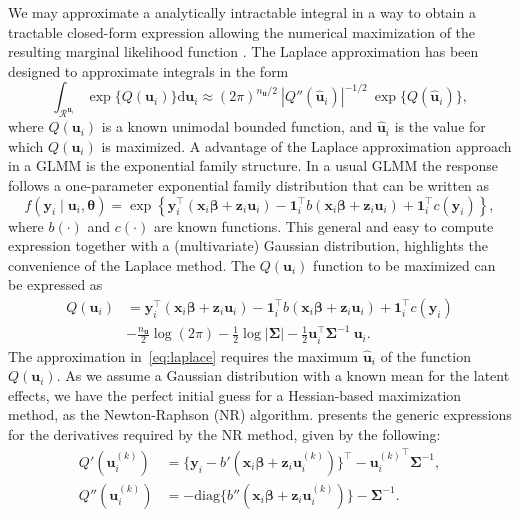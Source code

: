\documentclass[a4paper,12pt]{article}
\begin{document}
We may approximate a analytically intractable integral in a way to
obtain a tractable closed-form expression allowing the numerical
maximization of the resulting marginal likelihood function
\citep{patrao}. The Laplace approximation has been designed to
approximate integrals in the form
\begin{equation}
 \int_{\mathcal{R}^{\bm{u}_{i}}}
 \exp\{Q(\bm{u}_{i})\} \text{d} \bm{u}_{i}\approx
 (2\pi)^{n_{\bm{u}}/2}~
 |{Q}''(\bm{\hat{u}}_{i})|^{-1/2}~\exp\{Q(\bm{\hat{u}}_{i})\},
 \label{eq:laplace}
\end{equation}
where \(Q(\bm{u}_{i})\) is a known unimodal bounded function, and
\(\bm{\hat{u}}_{i}\) is the value for which \(Q(\bm{u}_{i})\) is
maximized. A advantage of the Laplace approximation approach in a GLMM
is the exponential family structure. In a usual GLMM the response
follows a one-parameter exponential family distribution that can be
written as
\[
 f(\bm{y}_{i} \mid \bm{u}_{i}, \bm{\theta}) =
 \exp \left\{
  \bm{y}_{i}^{\top} (\bm{x}_{i}\bm{\beta} + \bm{z}_{i}\bm{u}_{i}) -
  \bm{1}_{i}^{\top}b(\bm{x}_{i}\bm{\beta} + \bm{z}_{i}\bm{u}_{i}) +
  \bm{1}_{i}^{\top} c(\bm{y}_{i})
      \right\},
\]
where \(b(\cdot)\) and \(c(\cdot)\) are known functions. This general
and easy to compute expression together with a (multivariate) Gaussian
distribution, highlights the convenience of the Laplace method. The
\(Q(\bm{u}_{i})\) function to be maximized can be expressed as
\begin{equation}
 \begin{aligned}
  Q(\bm{u}_{i}) &=
  \bm{y}_{i}^{\top} (\bm{x}_{i}\bm{\beta} + \bm{z}_{i}\bm{u}_{i}) -
  \bm{1}_{i}^{\top}b(\bm{x}_{i}\bm{\beta} + \bm{z}_{i}\bm{u}_{i}) +
  \bm{1}_{i}^{\top} c(\bm{y}_{i})\\
  &- \frac{n_{\bm{u}}}{2} \log (2\pi) -
     \frac{1}{2} \log |\bm{\Sigma}| -
     \frac{1}{2} \bm{u}_{i}^{\top}\bm{\Sigma}^{-1}~\bm{u}_{i}.
 \end{aligned}
\end{equation}
The approximation in~\autoref{eq:laplace} requires the maximum
\(\bm{\hat{u}}_{i}\) of the function \(Q(\bm{u}_{i})\). As we assume a
Gaussian distribution with a known mean for the latent effects, we have
the perfect initial guess for a Hessian-based maximization method, as
the Newton-Raphson (NR) algorithm. \cite{patrao} presents the generic
expressions for the derivatives required by the NR method, given by the
following:
\begin{equation}
 \begin{aligned}
  {Q}'(\bm{u}_{i}^{(k)}) &=
  \{\bm{y}_{i} - {b}'(\bm{x}_{i}\bm{\beta} + \bm{z}_{i}\bm{u}_{i}^{(k)})
  \}^{\top} - {\bm{u}_{i}^{(k)}}^{\top} \bm{\Sigma}^{-1},\\
  {Q}''(\bm{u}_{i}^{(k)}) &=
  - \text{diag}\{{b}''(\bm{x}_{i}\bm{\beta}
  + \bm{z}_{i}\bm{u}_{i}^{(k)})\} - \bm{\Sigma}^{-1}.
 \end{aligned}
 \nonumber
\end{equation}
\end{document}
